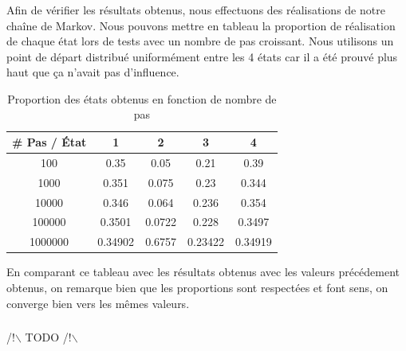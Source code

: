 \subsubsection{}
Afin de vérifier les résultats obtenus, nous effectuons des réalisations de notre chaîne de Markov. Nous pouvons mettre en tableau la proportion de réalisation 
de chaque état lors de tests avec un nombre de pas croissant. Nous utilisons un point de départ distribué uniformément entre les 4 états car il a été prouvé
plus haut que ça n'avait pas d'influence.

\begin{table}[h!]
  \begin{tabular}{|c|c|c|c|c|}
  \hline
  \# Pas / État & \multicolumn{1}{c|}{1} & \multicolumn{1}{c|}{2} & \multicolumn{1}{c|}{3} & 4 \\ \hline
  100     & 0.35    & 0.05   & 0.21    & 0.39    \\ \hline
  1000    & 0.351   & 0.075  & 0.23    & 0.344   \\ \hline
  10000   & 0.346   & 0.064  & 0.236   & 0.354   \\ \hline
  100000  & 0.3501  & 0.0722 & 0.228   & 0.3497  \\ \hline
  1000000 & 0.34902 & 0.6757 & 0.23422 & 0.34919 \\ \hline
  \end{tabular}
  \centering
  \caption{Proportion des états obtenus en fonction de nombre de pas}
  \label{tab:table-prop}
\end{table}

En comparant ce tableau avec les résultats obtenus avec les valeurs précédement obtenus, on remarque bien que les proportions sont respectées et font sens, on converge bien 
vers les mêmes valeurs.

\subsubsection{}
/!$\backslash$ TODO /!$\backslash$